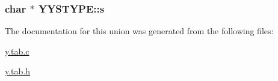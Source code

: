 \subsubsection[{\texorpdfstring{s}{s}}]{\setlength{\rightskip}{0pt plus 5cm}char $\ast$ Y\+Y\+S\+T\+Y\+P\+E\+::s}\hypertarget{unionYYSTYPE_a4c3840a759232ca58497542728f603e4}{}\label{unionYYSTYPE_a4c3840a759232ca58497542728f603e4}


The documentation for this union was generated from the following files\+:\begin{DoxyCompactItemize}
\item 
\hyperlink{y_8tab_8c}{y.\+tab.\+c}\item 
\hyperlink{y_8tab_8h}{y.\+tab.\+h}\end{DoxyCompactItemize}
